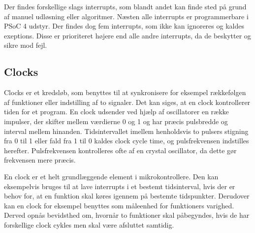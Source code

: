 Der findes forskellige slags interrupts, som blandt andet kan finde sted på grund af manuel udløsning eller algoritmer. Næsten alle interrupts er programmerbare i PSoC 4 udstyr. Der findes dog fem interrupts, som ikke kan ignoreres og kaldes exeptions. Disse er prioriteret højere end alle andre interrupts, da de beskytter og sikre mod fejl. \citep{Badiger2016}

\subsection{Clocks}
Clocks er et kredsløb, som benyttes til at synkronisere for eksempel rækkefølgen af funktioner eller indstilling af to signaler. Det kan siges, at en clock kontrollerer tiden for et program. En clock udsender ved hjælp af oscillatorer en række impulser, der skifter mellem værdierne 0 og 1 og har præcis pulsbredde og interval mellem hinanden. Tidsintervallet imellem henholdsvis to pulsers stigning fra 0 til 1 eller fald fra 1 til 0 %
kaldes clock cycle time, og pulsfrekvensen indstilles herefter. Pulsfrekvensen kontrolleres ofte af en crystal oscillator, da dette gør frekvensen mere præcis. \citep{Tanenbaum2006}

En clock er et helt grundlæggende element i mikrokontrollere. Den kan eksempelvis bruges til at lave interrupts i et bestemt tidsinterval, hvis der er behov for, at en funktion skal køres igennem på bestemte tidspunkter. Derudover kan en clock for eksempel benyttes som måleenhed for funktioners varighed. Derved opnås bevidsthed om, hvornår to funktioner skal påbegyndes, hvis de har forskellige clock cykles men skal være afsluttet samtidig. \citep{Tanenbaum2006}

